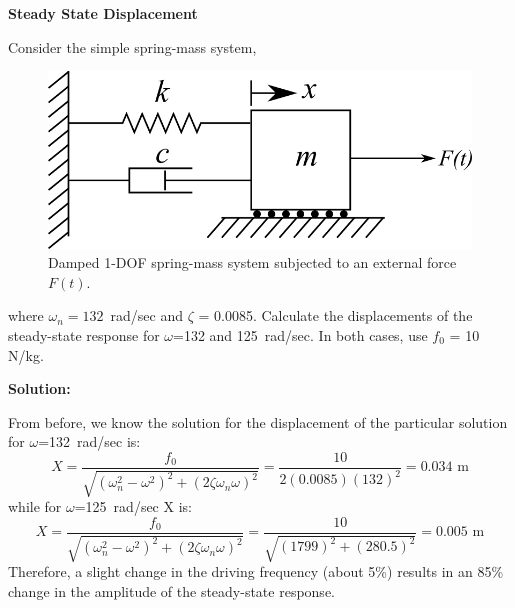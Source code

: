 \documentclass[12pt,letter]{article}
\begin{document}
	
	
\begin{example}
	\textbf{Steady State Displacement }

	\noindent Consider the simple spring-mass system, 
	\begin{figure}[H]
		\centering
		\includegraphics[]{../figures/1-DOF-spring_dashpot_mass_horizontal_forced.png}
		\caption{Damped 1-DOF spring-mass system subjected to an external force $F(t)$.}
	\end{figure}				
	\noindent where $\omega_n = 132$~rad/sec and $\zeta$ = 0.0085. Calculate the displacements of the steady-state response for $\omega$=132 and 125~rad/sec. In both cases, use $f_0$ = 10 N/kg. 

	\noindent \textbf{Solution:}

	\noindent 
	From before, we know the solution for the displacement of the particular solution for $\omega$=132~rad/sec is:
	\begin{equation}
		X = \frac{f_0}{\sqrt{(\omega_n^2 - \omega^2)^2 +  (2\zeta \omega_n \omega)^2}} = \frac{10}{2(0.0085)(132)^2} = 0.034 \text{ m}
	\end{equation}							
	while for $\omega$=125~rad/sec X is:
	\begin{equation}
		X = \frac{f_0}{\sqrt{(\omega_n^2 - \omega^2)^2 +  (2\zeta \omega_n \omega)^2}} = \frac{10}{\sqrt{(1799)^2 +  (280.5)^2}}  = 0.005 \text{ m}
	\end{equation}				
	Therefore, a slight change in the driving frequency (about 5\%) results in an 85\% change in the amplitude of the steady-state response. 
\end{example}
\end{document}
